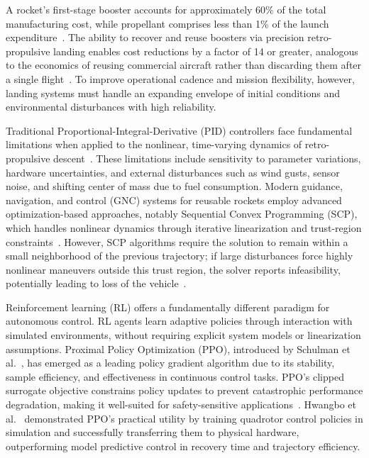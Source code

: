 \documentclass[10pt,twocolumn]{article}
\begin{document}
A rocket's first-stage booster accounts for approximately 60\% of the total manufacturing cost, while propellant comprises less than 1\% of the launch expenditure~\cite{bushnell2018}.
The ability to recover and reuse boosters via precision retro-propulsive landing enables cost reductions by a factor of 14 or greater, analogous to the economics of reusing commercial aircraft rather than discarding them after a single flight~\cite{bushnell2018}.
To improve operational cadence and mission flexibility, however, landing systems must handle an expanding envelope of initial conditions and environmental disturbances with high reliability.

Traditional Proportional-Integral-Derivative (PID) controllers face fundamental limitations when applied to the nonlinear, time-varying dynamics of retro-propulsive descent~\cite{konstantopoulos2020}.
These limitations include sensitivity to parameter variations, hardware uncertainties, and external disturbances such as wind gusts, sensor noise, and shifting center of mass due to fuel consumption.
Modern guidance, navigation, and control (GNC) systems for reusable rockets employ advanced optimization-based approaches, notably Sequential Convex Programming (SCP), which handles nonlinear dynamics through iterative linearization and trust-region constraints~\cite{ackmese2007}.
However, SCP algorithms require the solution to remain within a small neighborhood of the previous trajectory; if large disturbances force highly nonlinear maneuvers outside this trust region, the solver reports infeasibility, potentially leading to loss of the vehicle~\cite{ackmese2007}.

Reinforcement learning (RL) offers a fundamentally different paradigm for autonomous control.
RL agents learn adaptive policies through interaction with simulated environments, without requiring explicit system models or linearization assumptions.
Proximal Policy Optimization (PPO), introduced by Schulman et al.~\cite{schulman2017}, has emerged as a leading policy gradient algorithm due to its stability, sample efficiency, and effectiveness in continuous control tasks.
PPO's clipped surrogate objective constrains policy updates to prevent catastrophic performance degradation, making it well-suited for safety-sensitive applications~\cite{schulman2017}.
Hwangbo et al.~\cite{hwangbo2017} demonstrated PPO's practical utility by training quadrotor control policies in simulation and successfully transferring them to physical hardware, outperforming model predictive control in recovery time and trajectory efficiency.
\end{document}
